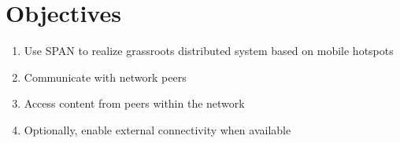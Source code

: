\section{Objectives}

\begin{frame}
    \begin{enumerate}
        \item Use SPAN to realize grassroots distributed system based on mobile hotspots
        \item Communicate with network peers
        \item Access content from peers within the network
        \item Optionally, enable external connectivity when available
    \end{enumerate}
\end{frame}